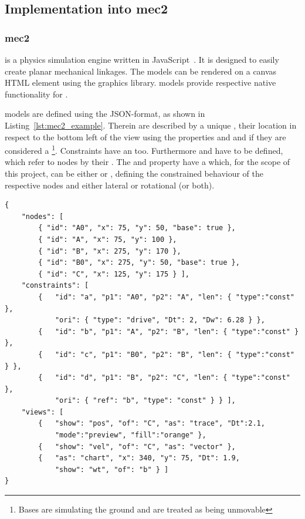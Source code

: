 \subsection{Implementation into mec2}

\subsubsection{mec2}

 is a physics simulation engine written in JavaScript~\cite{Goessner2021a}\cite{Goessner2019a}\cite{Goessner2019b}.
It is designed to easily create planar mechanical linkages.
The models can be rendered on a canvas HTML element using the  graphics library\cite{Goessner2021}.
 models provide respective native functionality for .

 models are defined using the JSON-format, as shown in Listing~\ref{lst:mec2_example}.
Therein  are described by a unique , their location in respect to the bottom left of the view using the properties  and  and if they are considered a \footnote{Bases are simulating the ground and are treated as being unmovable}.
Constraints have an  too.
Furthermore  and  have to be defined, which refer to nodes by their .
The  and  property have a  which, for the scope of this project, can be either  or , defining the constrained behaviour of the respective nodes  and  either lateral or rotational (or both).

\begin{lstlisting}[label={lst:mec2_example}, caption={ Example for a mechanism defined in the syntax proposed by \name{mec2}. }]
{
    "nodes": [
        { "id": "A0", "x": 75, "y": 50, "base": true },
        { "id": "A", "x": 75, "y": 100 },
        { "id": "B", "x": 275, "y": 170 },
        { "id": "B0", "x": 275, "y": 50, "base": true },
        { "id": "C", "x": 125, "y": 175 } ],
    "constraints": [
        {   "id": "a", "p1": "A0", "p2": "A", "len": { "type":"const" },
            "ori": { "type": "drive", "Dt": 2, "Dw": 6.28 } },
        {   "id": "b", "p1": "A", "p2": "B", "len": { "type":"const" } },
        {   "id": "c", "p1": "B0", "p2": "B", "len": { "type":"const" } },
        {   "id": "d", "p1": "B", "p2": "C", "len": { "type":"const" },
            "ori": { "ref": "b", "type": "const" } } ],
    "views": [
        {   "show": "pos", "of": "C", "as": "trace", "Dt":2.1,
            "mode":"preview", "fill":"orange" },
        {   "show": "vel", "of": "C", "as": "vector" },
        {   "as": "chart", "x": 340, "y": 75, "Dt": 1.9,
            "show": "wt", "of": "b" } ]
}
\end{lstlisting}


